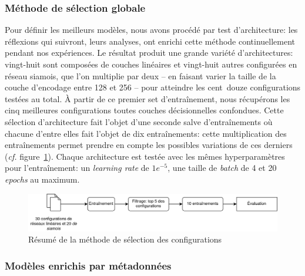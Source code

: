 \subsubsection{Méthode de sélection globale}

Pour définir les meilleurs modèles, nous avons procédé par test d'architecture: les réflexions qui suivront, leurs analyses, ont enrichi cette méthode continuellement pendant nos expériences. Le résultat produit une grande variété d'architectures: vingt-huit sont composées de couches linéaires et vingt-huit autres configurées en réseau siamois, que l'on multiplie par deux -- en faisant varier la taille de la couche d'encodage entre 128 et 256 -- pour atteindre les cent~douze configurations testées au total. À partir de ce premier set d'entraînement, nous récupérons les cinq meilleures configurations toutes couches décisionnelles confondues. Cette sélection d'architecture fait l'objet d'une seconde salve d'entraînements où chacune d'entre elles fait l'objet de dix entraînements: cette multiplication des entraînements permet prendre en compte les possibles variations de ces derniers (\textit{cf.} figure~\ref{fig:chap4:50configurations}). Chaque architecture est testée avec les mêmes hyperparamètres pour l'entraînement: un \textit{learning rate} de $1e^{-5}$, une taille de \textit{batch} de 4 et 20 \textit{epochs} au maximum. 

\begin{figure}[ht]
    \centering
    \includegraphics[width=\linewidth]{figures/chap4/50config.png}
    \caption{Résumé de la méthode de sélection des configurations}
    \label{fig:chap4:50configurations}
\end{figure}



\subsubsection{Modèles enrichis par métadonnées}

